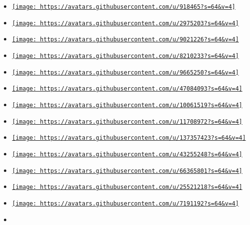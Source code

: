 \begin{itemize}
\tightlist
\item
  \href{https://github.com/damaxwell}{\texttt{[image: https://avatars.githubusercontent.com/u/918465?s=64\&v=4]}}
\item
  \href{https://github.com/bluebear94}{\texttt{[image: https://avatars.githubusercontent.com/u/2975203?s=64\&v=4]}}
\item
  \href{https://github.com/PgBiel}{\texttt{[image: https://avatars.githubusercontent.com/u/9021226?s=64\&v=4]}}
\item
  \href{https://github.com/Beiri22}{\texttt{[image: https://avatars.githubusercontent.com/u/8210233?s=64\&v=4]}}
\item
  \href{https://github.com/Dherse}{\texttt{[image: https://avatars.githubusercontent.com/u/9665250?s=64\&v=4]}}
\item
  \href{https://github.com/LaurenzV}{\texttt{[image: https://avatars.githubusercontent.com/u/47084093?s=64\&v=4]}}
\item
  \href{https://github.com/Mafii}{\texttt{[image: https://avatars.githubusercontent.com/u/10061519?s=64\&v=4]}}
\item
  \href{https://github.com/adriandelgado}{\texttt{[image: https://avatars.githubusercontent.com/u/11708972?s=64\&v=4]}}
\item
  \href{https://github.com/lolstork}{\texttt{[image: https://avatars.githubusercontent.com/u/137357423?s=64\&v=4]}}
\item
  \href{https://github.com/AlistairKeiller}{\texttt{[image: https://avatars.githubusercontent.com/u/43255248?s=64\&v=4]}}
\item
  \href{https://github.com/DVDTSB}{\texttt{[image: https://avatars.githubusercontent.com/u/66365801?s=64\&v=4]}}
\item
  \href{https://github.com/Enter-tainer}{\texttt{[image: https://avatars.githubusercontent.com/u/25521218?s=64\&v=4]}}
\item
  \href{https://github.com/EpicEricEE}{\texttt{[image: https://avatars.githubusercontent.com/u/7191192?s=64\&v=4]}}
\item

\end{itemize}
